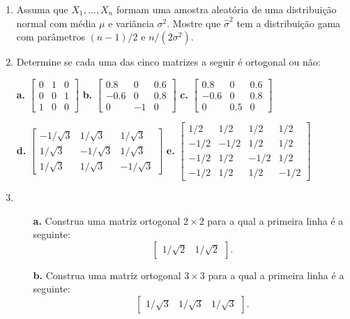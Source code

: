 \begin{enumerate}
    \item Assuma que $X_1, \dots, X_n$ formam uma amostra aleatória de uma distribuição normal com média $\mu$ e variância $\sigma^2$. Mostre que $\hat{\sigma}^2$ tem a distribuição gama com parâmetros $(n-1)/2$ e $n/(2\sigma^2)$.

    \item Determine se cada uma das cinco matrizes a seguir é ortogonal ou não:
    
    \textbf{a.} $\begin{bmatrix} 0 & 1 & 0 \\ 0 & 0 & 1 \\ 1 & 0 & 0 \end{bmatrix}$
    \quad
    \textbf{b.} $\begin{bmatrix} 0.8 & 0 & 0.6 \\ -0.6 & 0 & 0.8 \\ 0 & -1 & 0 \end{bmatrix}$
    \quad
    \textbf{c.} $\begin{bmatrix} 0.8 & 0 & 0.6 \\ -0.6 & 0 & 0.8 \\ 0 & 0.5 & 0 \end{bmatrix}$
    
    \textbf{d.} $\begin{bmatrix} -1/\sqrt{3} & 1/\sqrt{3} & 1/\sqrt{3} \\ 1/\sqrt{3} & -1/\sqrt{3} & 1/\sqrt{3} \\ 1/\sqrt{3} & 1/\sqrt{3} & -1/\sqrt{3} \end{bmatrix}$
    \quad
    \textbf{e.} $\begin{bmatrix} 1/2 & 1/2 & 1/2 & 1/2 \\ -1/2 & -1/2 & 1/2 & 1/2 \\ -1/2 & 1/2 & -1/2 & 1/2 \\ -1/2 & 1/2 & 1/2 & -1/2 \end{bmatrix}$

    \item 
    \begin{enumerate}
        \item[\textbf{a.}] Construa uma matriz ortogonal $2 \times 2$ para a qual a primeira linha é a seguinte:
        $$ \begin{bmatrix} 1/\sqrt{2} & 1/\sqrt{2} \end{bmatrix}. $$
        \item[\textbf{b.}] Construa uma matriz ortogonal $3 \times 3$ para a qual a primeira linha é a seguinte:
        $$ \begin{bmatrix} 1/\sqrt{3} & 1/\sqrt{3} & 1/\sqrt{3} \end{bmatrix}. $$
    \end{enumerate}


\end{enumerate}
